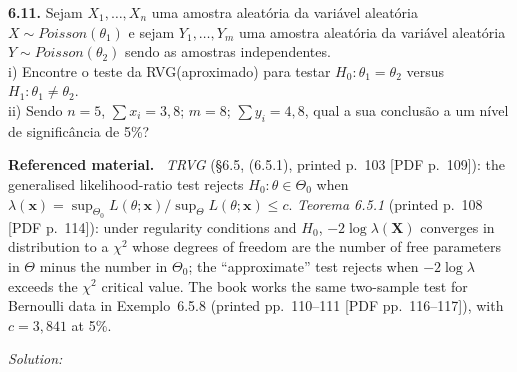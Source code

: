 \documentclass[11pt,a4paper]{article}
\newif\ifsolucoes
\newcommand{\espacoresol}{4.5cm}   %
\numberwithin{equation}{questao}   %
\newenvironment{refmat}{\par\smallskip\noindent\small\textbf{Referenced material.}\ }{\par\smallskip}
\newcommand{\resolespaco}{\ifsolucoes\else\par\textit{Solution:}\vspace{\espacoresol}\par\fi}
\begin{document}
\begin{otherlanguage}{brazil}
\textbf{6.11.} Sejam $X_1,\dots,X_n$ uma amostra aleatória da variável aleatória
$X\sim Poisson(\theta_1)$ e sejam $Y_1,\dots,Y_m$ uma amostra aleatória da variável aleatória
$Y\sim Poisson(\theta_2)$ sendo as amostras independentes.\\
i) Encontre o teste da RVG(aproximado) para testar $H_0:\theta_1=\theta_2$ versus
$H_1:\theta_1\neq\theta_2$.\\
ii) Sendo $n=5$, $\sum x_i=3{,}8$; $m=8$; $\sum y_i=4{,}8$, qual a sua conclusão a um nível de
significância de 5\%?
\end{otherlanguage}
\begin{refmat}
\emph{TRVG} (§6.5, (6.5.1), printed p.~103 [PDF p.~109]): the generalised likelihood-ratio test
rejects $H_0:\theta\in\Theta_0$ when
$\lambda(\mathbf x)=\sup_{\Theta_0}L(\theta;\mathbf x)/\sup_{\Theta}L(\theta;\mathbf x)\le c$.
\emph{Teorema 6.5.1} (printed p.~108 [PDF p.~114]): under regularity conditions and $H_0$,
$-2\log\lambda(\mathbf X)$ converges in distribution to a $\chi^2$ whose degrees of freedom are the number
of free parameters in $\Theta$ minus the number in $\Theta_0$; the ``approximate'' test rejects when
$-2\log\lambda$ exceeds the $\chi^2$ critical value. The book works the same two-sample test for
Bernoulli data in Exemplo~6.5.8 (printed pp.~110--111 [PDF pp.~116--117]), with $c=3{,}841$ at 5\%.
\end{refmat}
\resolespaco
\end{document}
